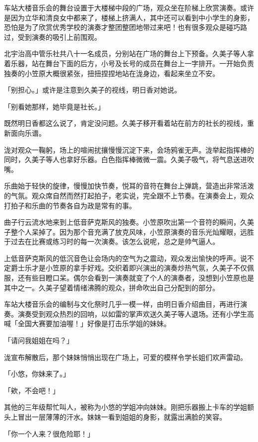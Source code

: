 \documentclass[UTF8]{ctexart}
\begin{document}
    车站大楼音乐会的舞台设置于大楼梯中段的广场，观众坐在阶梯上欣赏演奏。或许是因为立华和清良女中都来了，楼梯上挤满人，其中还可以看到中小学生的身影，恐怕是为了欣赏优秀学校的演奏才整团整团地带过来吧！也有很多观众是碰巧路过，受到演奏的吸引上前围观。 

    北宇治高中管乐社共八十一名成员，分别站在广场的舞台上下预备。久美子等人拿着乐器，站在舞台下面的后方，小号及长号的成员在舞台上一字排开。一开始负责独奏的小笠原大概很紧张，扭扭捏捏地站在泷身边，看起来坐立不安。 

    「别担心。」或许是注意到久美子的视线，明日香对她说。 

    「别看她那样，她毕竟是社长。」 

    既然明日香都这么说了，肯定没问题。久美子移开看着站在前方的社长的视线，重新面向乐谱。 

    泷对观众一鞠躬，场上的喧闹扰攘慢慢沉淀下来，会场鸦雀无声。泷举起指挥棒的同时，久美子等人也拿好乐器。白色指挥棒微微一震。久美子吸气，将气息送进吹嘴。 

    乐曲始于轻快的旋律，慢慢加快节奏，悦耳的音符在舞台上弹跳，营造出非常活泼的气氛。观众席自然而然打起拍子，老实说，完全跟不上节奏。在演奏会上，观众打拍子和乐曲的节奏各自为政是常有的事。 

    曲子行云流水地来到上低音萨克斯风的独奏。小笠原吹出第一个音符的瞬间，久美子整个人呆掉了。因为那个音充满了放克风味，小笠原演奏的音乐光灿耀眼，远胜于过去在比赛或练习时的每一次演奏。该怎么说呢，总之是帅气逼人。 

    上低音萨克斯风的低沉音色让会场内的空气为之震动，观众发出愉快的呼声。说不定爵士乐才是小笠原的拿手好戏。交织着即兴演出的演奏炒热气氛，久美子不仅佩服，还有些目瞪口呆。偶尔会看到一演奏就变了个人的演奏者，没想到小笠原也是其中之一。久美子望着情绪沸腾的观众，拼命吹出自己分配到的部分。 

    车站大楼音乐会的编制与文化祭时几乎一模一样，由明日香介绍曲目，再进行演奏。演奏受到观众热烈的回响，以如雷的掌声欢送久美子等人退场。还有小学生高喊「全国大赛要加油喔！」好像是打击乐学姐的妹妹。 

    「请问我姐姐在吗？」 

    泷宣布解散后，那个妹妹悄悄出现在广场上，可爱的模样令学长姐们欢声雷动。 

    「小悠，你妹来了。」 

    「欸，不会吧！」 

    其他的三年级帮忙叫人，被称为小悠的学姐冲向妹妹。刚把乐器搬上卡车的学姐额头上冒出一层薄薄的汗水。妹妹一看到姐姐的身影，就露出满脸的笑容。 

    「你一个人来？很危险耶！」 
\end{document}
